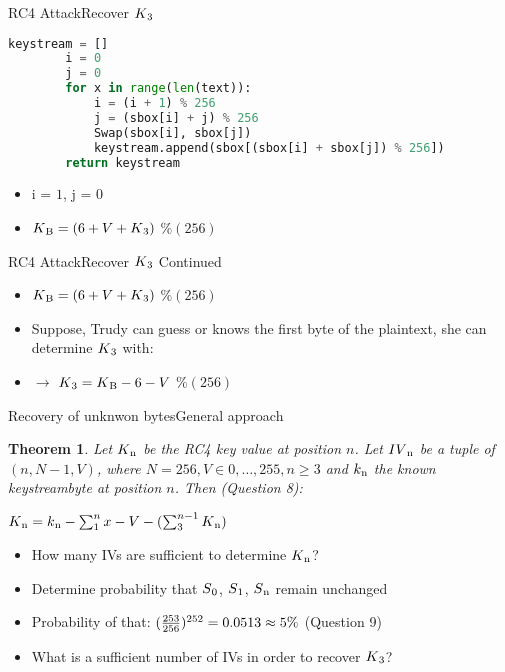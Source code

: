 \documentclass[
	aspectratio=169,	%
	onlytextwidth,		%
	t,					%
	]{beamer}
\newtheorem{thm}{Theorem}
\begin{document}
\begin{frame}[fragile]{RC4 Attack}{Recover $K\textsubscript{3}$}

	\begin{lstlisting}[language=Python]
		keystream = []
		i = 0
		j = 0
		for x in range(len(text)):
			i = (i + 1) % 256
			j = (sbox[i] + j) % 256
			Swap(sbox[i], sbox[j])
			keystream.append(sbox[(sbox[i] + sbox[j]) % 256])    
		return keystream   
	\end{lstlisting}
	\begin{itemize}
		\item i = $1$, j = $0$
		\item $K\textsubscript{B} = (6 + V + K\textsubscript{3})$ $\% (256)$
	\end{itemize}

\end{frame}

\begin{frame}[fragile]{RC4 Attack}{Recover $K\textsubscript{3}$ Continued}

	\begin{itemize}
		\item $K\textsubscript{B} = (6 + V + K\textsubscript{3})$ $\% (256)$
		\item Suppose, Trudy can guess or knows the first byte of the plaintext, she can determine $K\textsubscript{3}$ with:
		\item $\rightarrow$ $K\textsubscript{3}  = K\textsubscript{B} - 6 - V$ $\% (256)$
	\end{itemize}
\end{frame}

\begin{frame}[fragile]{Recovery of unknwon bytes}{General approach} 
	\begin{thm}
		Let $ K\textsubscript{n} $ be the RC4 key value at position $ n $. Let $ IV\textsubscript{n} $ be a tuple of $ (n, N-1, V) $,
		where $ N = 256, V \in {{0,\dots,255}}, n \geq 3 $ and $ k\textsubscript{n} $ the known keystreambyte at position $n$. Then (Question 8): \\
		\begin{center}
			$K\textsubscript{n} = k\textsubscript{n} - \sum_{1}^{n}x - V - (\sum_{3}^{n-1}K\textsubscript{n})$
		\end{center}
	\end{thm} 
	\begin{itemize}
		\item How many IVs are sufficient to determine $ K\textsubscript{n} $?
		\item Determine probability that $ S\textsubscript{0}$, $S\textsubscript{1}$, $S\textsubscript{n} $ remain unchanged
		\item Probability of that: $(\frac{253}{256})\textsuperscript{252} = 0.0513 \approx 5\%$ (Question 9)
		\item What is a sufficient number of IVs in order to recover $K\textsubscript{3}$?
	\end{itemize}
\end{frame}
\end{document}
